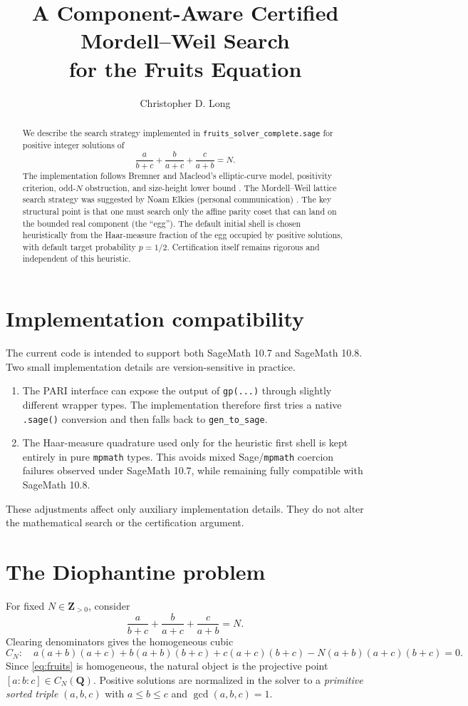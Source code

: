 \documentclass[11pt]{article}
\title{A Component-Aware Certified Mordell--Weil Search\\for the Fruits Equation}
\author{Christopher D. Long}
\date{}
\newcommand{\Q}{\mathbf Q}
\newcommand{\Z}{\mathbf Z}
\begin{document}
\maketitle

\begin{abstract}
We describe the search strategy implemented in \texttt{fruits\_solver\_complete.sage} for positive integer solutions of
\[
\frac{a}{b+c}+\frac{b}{a+c}+\frac{c}{a+b}=N.
\]
The implementation follows Bremner and Macleod's elliptic-curve model, positivity criterion, odd-$N$ obstruction, and size-height lower bound \cite{BremnerMacleod2014}. The Mordell--Weil lattice search strategy was suggested by Noam Elkies (personal communication) \cite{ElkiesPersonalCommunication}. The key structural point is that one must search only the affine parity coset that can land on the bounded real component (the ``egg''). The default initial shell is chosen heuristically from the Haar-measure fraction of the egg occupied by positive solutions, with default target probability $p=1/2$. Certification itself remains rigorous and independent of this heuristic.
\end{abstract}

\section{Implementation compatibility}
The current code is intended to support both SageMath 10.7 and SageMath 10.8. Two small implementation details are version-sensitive in practice.
\begin{enumerate}[label=\arabic*.]
\item The PARI interface can expose the output of \texttt{gp(...)} through slightly different wrapper types. The implementation therefore first tries a native \texttt{.sage()} conversion and then falls back to \texttt{gen\_to\_sage}.
\item The Haar-measure quadrature used only for the heuristic first shell is kept entirely in pure \texttt{mpmath} types. This avoids mixed Sage/\texttt{mpmath} coercion failures observed under SageMath 10.7, while remaining fully compatible with SageMath 10.8.
\end{enumerate}
These adjustments affect only auxiliary implementation details. They do not alter the mathematical search or the certification argument.

\section{The Diophantine problem}
For fixed $N\in\Z_{>0}$, consider
\begin{equation}\label{eq:fruits}
\frac{a}{b+c}+\frac{b}{a+c}+\frac{c}{a+b}=N.
\end{equation}
Clearing denominators gives the homogeneous cubic
\begin{equation}\label{eq:cubic}
C_N:\quad a(a+b)(a+c)+b(a+b)(b+c)+c(a+c)(b+c)-N(a+b)(a+c)(b+c)=0.
\end{equation}
Since \eqref{eq:fruits} is homogeneous, the natural object is the projective point $[a:b:c]\in C_N(\Q)$. Positive solutions are normalized in the solver to a \emph{primitive sorted triple} $(a,b,c)$ with $a\le b\le c$ and $\gcd(a,b,c)=1$.
\end{document}
